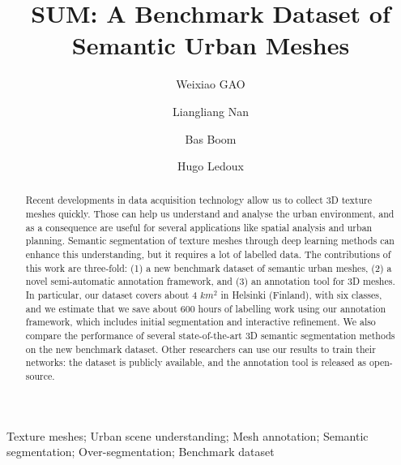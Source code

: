 \documentclass{elsarticle}
\begin{document}
\sloppy
	
	\begin{frontmatter}
		
		\title{SUM: A Benchmark Dataset of \textbf{S}emantic \textbf{U}rban \textbf{M}eshes}
		
		\author[TUDelftaddress]{Weixiao GAO}
		
		\author[TUDelftaddress]{Liangliang Nan}
		
		\author[CMTaddress]{Bas Boom}
		
		\author[TUDelftaddress]{Hugo Ledoux}
		
		\address[TUDelftaddress]{3D Geoinformation Research Group, Faculty of Architecture and the Built Environment, Delft University of Technology, 2628 BL Delft, The Netherlands}
		\address[CMTaddress]{CycloMedia Technology, Zaltbommel, The Netherlands}
		
		\begin{abstract}
		Recent developments in data acquisition technology allow us to collect 3D texture meshes quickly.
		Those can help us understand and analyse the urban environment, and as a consequence are useful for several applications like spatial analysis and urban planning.
		Semantic segmentation of texture meshes through deep learning methods can enhance this understanding, but it requires a lot of labelled data.
		The contributions of this work are three-fold: (1) a new benchmark dataset of semantic urban meshes, (2) a novel semi-automatic annotation framework, and (3) an annotation tool for 3D meshes.
		In particular, our dataset covers about  4 $km^2$ in Helsinki (Finland), with six classes, and we estimate that we save about 600 hours of labelling work using our annotation framework, which includes initial segmentation and interactive refinement.
		We also compare the performance of several state-of-the-art 3D semantic segmentation methods on the new benchmark dataset.  
		Other researchers can use our results to train their networks: the dataset is publicly available, and the annotation tool is released as open-source.
		\end{abstract}
	
		\begin{keyword}
			 Texture meshes; Urban scene understanding; Mesh annotation; Semantic segmentation; Over-segmentation; Benchmark dataset
		\end{keyword}
	\end{frontmatter}
	
	
	
	
	
	

	
	
	
	
	

	
	
\end{document}

